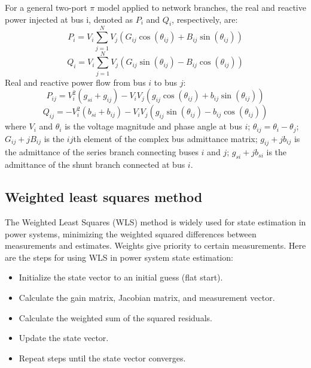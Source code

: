 For a general two-port $\pi$ model applied to network branches, the real and reactive power injected at bus i, denoted as $P_i$ and $Q_i$, respectively, are:
\begin{equation}
    P_{i}=V_{i} \sum_{j=1}^{N} V_{j}\left(G_{i j} \cos \left(\theta_{i j}\right)+B_{i j} \sin \left(\theta_{i j}\right)\right)
\end{equation}
\begin{equation}
    Q_{i}=V_{i} \sum_{j=1}^{N} V_{j}\left(G_{i j} \sin \left(\theta_{i j}\right)-B_{i j} \cos \left(\theta_{i j}\right)\right)
\end{equation}
Real and reactive power flow from bus $i$ to bus $j$:
\begin{equation}
    P_{i j}=V_{i}^{2}\left(g_{s i}+g_{i j}\right)-V_{i} V_{j}\left(g_{i j} \cos \left(\theta_{i j}\right)+b_{i j} \sin \left(\theta_{i j}\right)\right)
\end{equation}
\begin{equation}
    Q_{i j}=-V_{i}^{2}\left(b_{s i}+b_{i j}\right)-V_{i} V_{j}\left(g_{i j} \sin \left(\theta_{i j}\right)-b_{i j} \cos \left(\theta_{i j}\right)\right)
\end{equation}
where $V_i$ and $\theta_i$ is the voltage magnitude and phase angle at bus $i$; \(\theta_{ij} = \theta_i-\theta_j\);  \(G_{ij}+jB_{ij}\) is the $ij$th element of the complex bus admittance matrix; \(g_{ij}+jb_{ij}\) is the admittance of the series branch connecting buses $i$ and $j$; \(g_{si}+jb_{si}\) is the admittance of the shunt branch connected at bus $i$.

\subsection{Weighted least squares method}\label{subsec:ch1/sec4/sub3}

The Weighted Least Squares (WLS) method is widely used for state estimation in power systems, minimizing the weighted squared differences between measurements and estimates. Weights give priority to certain measurements. Here are the steps for using WLS in power system state estimation:
\begin{itemize}
    \item Initialize the state vector to an initial guess (flat start).
    \item Calculate the gain matrix, Jacobian matrix, and measurement vector.
    \item Calculate the weighted sum of the squared residuals.
    \item Update the state vector.
    \item Repeat steps until the state vector converges.
\end{itemize}

